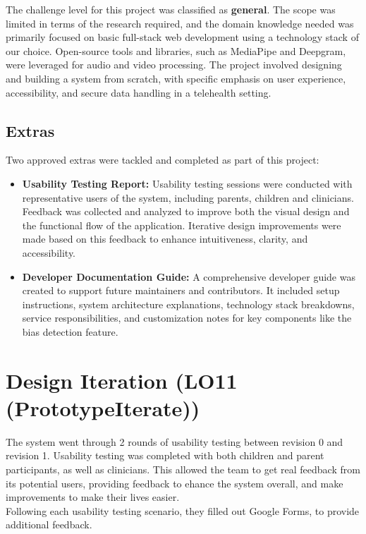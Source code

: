 \documentclass{article}
\begin{document}
\hspace{2em}The challenge level for this project was classified as \textbf{general}. The scope was limited in terms of the research required, and the domain knowledge needed was primarily focused on basic full-stack web development using a technology stack of our choice. 
Open-source tools and libraries, such as MediaPipe and Deepgram, were leveraged for audio and video processing. The project involved designing and building a system from scratch, with specific emphasis on user experience, accessibility, and secure data handling in a telehealth setting.

\subsection{Extras}

Two approved extras were tackled and completed as part of this project:

\begin{itemize}
    \item \textbf{Usability Testing Report:} Usability testing sessions were conducted with representative users of the system, including parents, children and clinicians. 
    Feedback was collected and analyzed to improve both the visual design and the functional flow of the application. Iterative design improvements were made based on this feedback to enhance intuitiveness, clarity, and accessibility.
    
    \item \textbf{Developer Documentation Guide:} A comprehensive developer guide was created to support future maintainers and contributors. 
    It included setup instructions, system architecture explanations, technology stack breakdowns, service responsibilities, and customization notes for key components like the bias detection feature.
\end{itemize}

\newpage

\section{Design Iteration (LO11 (PrototypeIterate))}

\hspace{2em} The system went through 2 rounds of usability testing between revision 0 and revision 1. Usability testing was completed with both children and parent participants, as well as clinicians.
This allowed the team to get real feedback from its potential users, providing feedback to ehance the system overall, and make improvements to make their lives easier.\\
Following each usability testing scenario, they filled out Google Forms, to provide additional feedback.
\end{document}
